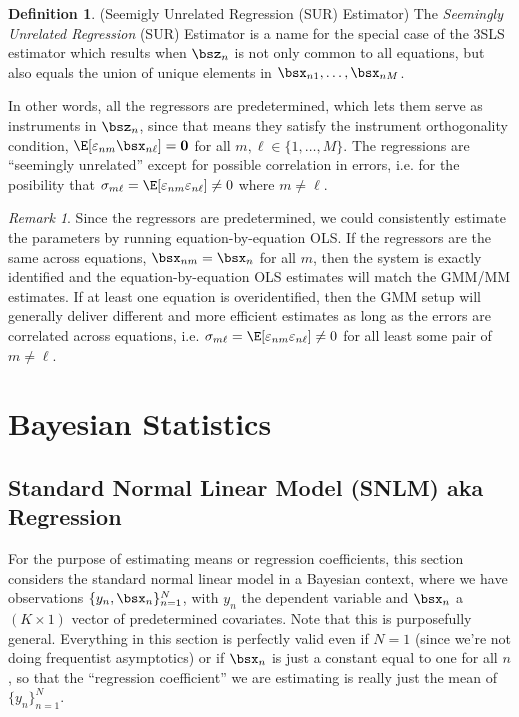 \documentclass[12pt]{article}
\theoremstyle{plain}
\theoremstyle{definition}
\newtheorem{defn}[thm]{Definition}
\theoremstyle{remark}
\newtheorem*{rmk}{Remark}
\renewcommand{\bso}{\boldsymbol{0}}
\newcommand{\nN}{_{n=1}^N}
\begin{document}
\begin{defn}(Seemigly Unrelated Regression (SUR) Estimator)
The \emph{Seemingly Unrelated Regression} (SUR) Estimator is a name for
the special case of the 3SLS estimator which results when $\bsz_n$ is
not only common to all equations, but also equals the union of unique
elements in $\bsx_{n1},\ldots,\bsx_{nM}$.

In other words, all the regressors are predetermined, which lets them
serve as instruments in $\bsz_n$, since that means they satisfy the
instrument orthogonality condition,
$\E[\varepsilon_{nm}\bsx_{n\ell}]=\bso$ for all
$m,\ell\in\{1,\ldots,M\}$.
The regressions are
``seemingly unrelated'' except for possible correlation in errors, i.e.
for the posibility that
$\sigma_{m\ell}=\E[\varepsilon_{nm}\varepsilon_{n\ell}]\neq0$ where
$m\neq\ell$.
\end{defn}

\begin{rmk}
Since the regressors are predetermined, we could consistently estimate
the parameters by running equation-by-equation OLS. If the regressors
are the same across equations, $\bsx_{nm}=\bsx_n$ for all $m$, then the
system is exactly identified and the equation-by-equation OLS estimates
will match the GMM/MM estimates. If at least one equation is
overidentified, then the GMM setup will generally deliver different and
more efficient estimates as long as the errors are correlated across
equations, i.e.
$\sigma_{m\ell}=\E[\varepsilon_{nm}\varepsilon_{n\ell}]\neq 0$ for all
least some pair of $m\neq\ell$.
\end{rmk}


\clearpage
\section{Bayesian Statistics}

\subsection{Standard Normal Linear Model (SNLM) aka Regression}

For the purpose of estimating means or regression coefficients, this
section considers the standard normal linear model in a Bayesian
context, where we have observations $\{y_n,\bsx_n\}\nN$, with $y_n$
the dependent variable and $\bsx_n$ a $(K\times 1)$ vector of
predetermined covariates.
Note that this is purposefully general. Everything in this section
is perfectly valid even if $N=1$ (since we're not doing frequentist
asymptotics) or if $\bsx_n$ is just a constant equal to one for all $n$,
so that the ``regression coefficient'' we are estimating is really just
the mean of $\{y_n\}\nN$.
\end{document}
